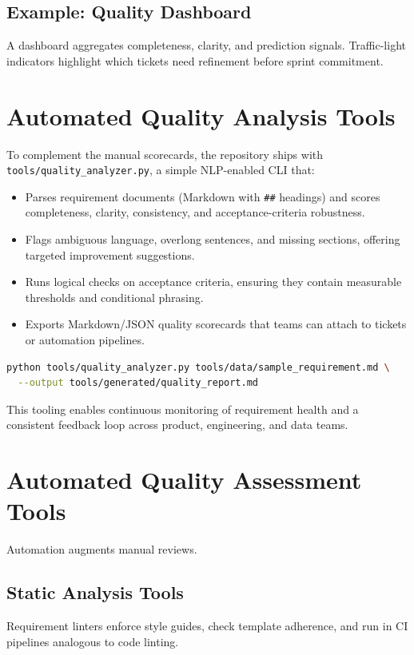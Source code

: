 \subsection{Example: Quality Dashboard}
A dashboard aggregates completeness, clarity, and prediction signals. Traffic-light indicators highlight which tickets need refinement before sprint commitment.

\section{Automated Quality Analysis Tools}
\label{sec:quality-tools}

To complement the manual scorecards, the repository ships with \texttt{tools/quality\_analyzer.py}, a simple NLP-enabled CLI that:
\begin{itemize}
    \item Parses requirement documents (Markdown with \texttt{\#\#} headings) and scores completeness, clarity, consistency, and acceptance-criteria robustness.
    \item Flags ambiguous language, overlong sentences, and missing sections, offering targeted improvement suggestions.
    \item Runs logical checks on acceptance criteria, ensuring they contain measurable thresholds and conditional phrasing.
    \item Exports Markdown/JSON quality scorecards that teams can attach to tickets or automation pipelines.
\end{itemize}

\begin{lstlisting}[language=bash,caption={Running the quality analyzer against a sample requirement.}]
python tools/quality_analyzer.py tools/data/sample_requirement.md \
  --output tools/generated/quality_report.md
\end{lstlisting}

This tooling enables continuous monitoring of requirement health and a consistent feedback loop across product, engineering, and data teams.

\section{Automated Quality Assessment Tools}
\label{sec:automated-tools}

Automation augments manual reviews.

\subsection{Static Analysis Tools}
Requirement linters enforce style guides, check template adherence, and run in CI pipelines analogous to code linting.

